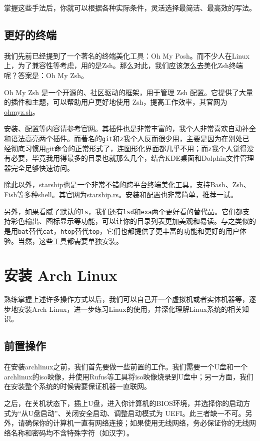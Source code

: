 掌握这些手法后，你就可以根据各种实际条件，灵活选择最简洁、最高效的写法。

\subsection{更好的终端}

我们先前已经提到了一个著名的终端美化工具：Oh My Posh。而不少人在Linux上，为了兼容性等考虑，用的是Zsh。那么对此，我们应该怎么去美化Zsh终端呢？答案是：Oh My Zsh。

Oh My Zsh 是一个开源的、社区驱动的框架，用于管理 Zsh 配置。它提供了大量的插件和主题，可以帮助用户更好地使用 Zsh，提高工作效率，其官网为\url{ohmyz.sh}。

安装、配置等内容请参考官网。其插件也是非常丰富的，我个人非常喜欢自动补全和语法高亮两个插件。而著名的\texttt{git}和\texttt{z}我个人反而很少用，主要是因为在别处已经彻底习惯用git命令的正常形式了，连图形化界面都几乎不用；而\texttt{z}我个人觉得没有必要，毕竟我用得最多的目录也就那么几个，结合KDE桌面和Dolphin文件管理器完全足够快速访问。

除此以外，starship也是一个非常不错的跨平台终端美化工具，支持Bash、Zsh、Fish等多种shell。其官网为\url{starship.rs}。安装和配置也非常简单，推荐一试。

另外，如果看腻了默认的\texttt{ls}，我们还有\texttt{lsd}和\texttt{exa}两个更好看的替代品。它们都支持彩色输出、图标显示等功能，可以让你的目录列表更加美观和易读。与之类似的是用\texttt{bat}替代\texttt{cat}，\texttt{htop}替代\texttt{top}，它们也都提供了更丰富的功能和更好的用户体验。当然，这些工具都需要单独安装。

\section{安装 Arch Linux}

熟练掌握上述许多操作方式以后，我们可以自己开一个虚拟机或者实体机器等，逐步地安装Arch Linux，进一步练习Linux的使用，并深化理解Linux系统的相关知识。

\subsection{前置操作}

在安装archlinux之前，我们首先要做一些前置的工作。我们需要一个U盘和一个archlinux的iso映像，并使用Rufus等工具将iso映像烧录到U盘中；另一方面，我们在安装整个系统的时候需要保证机器一直联网。

之后，在关机状态下，插上U盘，进入你计算机的BIOS环境，并选择你的启动方式为“从U盘启动”、关闭安全启动、调整启动模式为 UEFI。此三者缺一不可。另外，请确保你的计算机一直有网络连接；如果使用无线网络，务必保证你的无线网络名称和密码均不含特殊字符（如汉字）。


